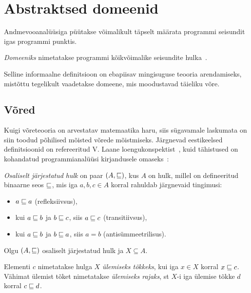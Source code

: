 \documentclass[../thesis.tex]{subfiles}
\begin{document}
\section{Abstraktsed domeenid}

Andmevooanalüüsiga püütakse võimalikult täpselt määrata programmi seisundit igas programmi punktis.

\begin{definition}
\emph{Domeeniks} nimetatakse programmi kõikvõimalike seisundite hulka~\cite{vojdani_magister}.
\end{definition}

Selline informaalne definitsioon on ebapiisav mingisuguse teooria arendamiseks, mistõttu tegelikult vaadetakse domeene, mis moodustavad täieliku võre.

\subsection{Võred}

Kuigi võreteooria on arvestatav matemaatika haru, siis sügavamale laskumata on siin toodud põhilised mõisted võrede mõistmiseks.
Järgnevad eestikeelsed definitsioonid on refereeritud V. Laane loengukonspektist~\cite{laan_voreteooria}, kuid tähistused on kohandatud programmianalüüsi kirjandusele omaseks~\cite[17]{seidl_foundations}:

\begin{definition}
\label{def:järjestatud_hulk}
\emph{Osaliselt järjestatud hulk} on paar $(A, \sqsubseteq)$, kus $A$ on hulk, millel on defineeritud binaarne seos $\sqsubseteq$, mis iga $a, b, c \in A$ korral rahuldab järgnevaid tingimusi:
\begin{itemize}[nosep]
	\item $a \sqsubseteq a$ (refleksiivsus),
	\item kui $a \sqsubseteq b$ ja $b \sqsubseteq c$, siis $a \sqsubseteq c$ (transitiivsus),
	\item kui $a \sqsubseteq b$ ja $b \sqsubseteq a$, siis $a = b$ (antisümmeetrilisus).
\end{itemize}
\end{definition}

Olgu $(A, \sqsubseteq)$ osaliselt järjestatud hulk ja $X \subseteq A$.

\begin{definition}
\label{def:join}
Elementi $c$ nimetatakse hulga $X$ \emph{ülemiseks tõkkeks}, kui iga $x \in X$ korral $x \sqsubseteq c$. Vähimat ülemist tõket nimetatakse \emph{ülemiseks rajaks}, st $X$-i iga ülemise tõkke $d$ korral $c \sqsubseteq d$.
\end{definition}
\end{document}
